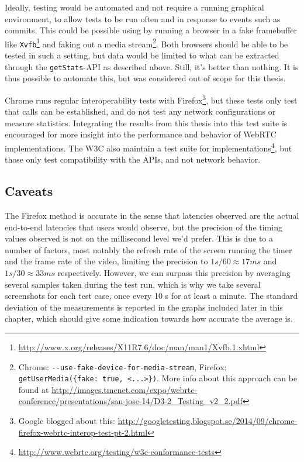 Ideally, testing would be automated and not require a running graphical environment, to allow tests to be run often and in response to events such as commits. This could be possible using by running a browser in a fake framebuffer like \texttt{Xvfb}\footnote{\url{http://www.x.org/releases/X11R7.6/doc/man/man1/Xvfb.1.xhtml}} and faking out a media stream\footnote{Chrome: \texttt{-{}-use-fake-device-for-media-stream}, Firefox: \texttt{getUserMedia(\{fake: true, <...>\})}. More info about this approach can be found at \url{http://images.tmcnet.com/expo/webrtc-conference/presentations/san-jose-14/D3-2_Testing_v2_2.pdf}}. Both browsers should be able to be tested in such a setting, but data would be limited to what can be extracted through the \texttt{getStats}-API as described above. Still, it's better than nothing. It is thus possible to automate this, but was considered out of scope for this thesis.

Chrome runs regular interoperability tests with Firefox\footnote{Google blogged about this: \url{http://googletesting.blogspot.se/2014/09/chrome-firefox-webrtc-interop-test-pt-2.html}}, but these tests only test that calls can be established, and do not test any network configurations or measure statistics. Integrating the results from this thesis into this test suite is encouraged for more insight into the performance and behavior of WebRTC implementations. The W3C also maintain a test suite for implementations\footnote{\url{http://www.webrtc.org/testing/w3c-conformance-tests}}, but those only test compatibility with the APIs, and not network behavior.


\subsection{Caveats}

The Firefox method is accurate in the sense that latencies observed are the actual end-to-end latencies that users would observe, but the precision of the timing values observed is not on the millisecond level we'd prefer. This is due to a number of factors, most notably the refresh rate of the screen running the timer and the frame rate of the video, limiting the precision to $1 s/60\approx17 ms$ and $1 s/30\approx33 ms$ respectively. However, we can surpass this precision by averaging several samples taken during the test run, which is why we take several screenshots for each test case, once every 10 s for at least a minute. The standard deviation of the measurements is reported in the graphs included later in this chapter, which should give some indication towards how accurate the average is.

